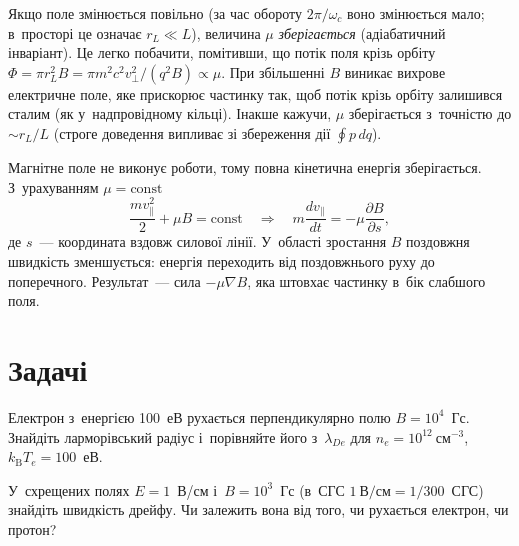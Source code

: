 Якщо поле змінюється повільно (за час обороту $2\pi/\omega_c$ воно змінюється мало;
в~просторі це означає $r_L\ll L$), величина $\mu$ \emph{зберігається} (адіабатичний
інваріант). Це легко побачити, помітивши, що потік поля крізь орбіту $\Phi=\pi r_L^2B=\pi
m^2c^2v_\perp^2/(q^2B)\propto\mu$. При збільшенні $B$ виникає вихрове електричне поле, яке
прискорює частинку так, щоб потік крізь орбіту залишився сталим (як у~надпровідному
кільці). Інакше кажучи, $\mu$ зберігається з~точністю до $\sim r_L/L$ (строге доведення
випливає зі збереження дії $\oint p\,dq$).

Магнітне поле не виконує роботи, тому повна кінетична енергія зберігається. З~урахуванням
$\mu=\mathrm{const}$
\begin{equation}\label{eq:energy-mu}
	\frac{mv_\parallel^2}2+\mu B=\mathrm{const}\quad\Rightarrow\quad m\frac{dv_\parallel}{dt}=-\mu\frac{\partial B}{\partial s},
\end{equation}
де $s$~--- координата вздовж силової лінії. У~області зростання $B$ поздовжня швидкість
зменшується: енергія переходить від поздовжнього руху до поперечного. Результат~--- сила
$-\mu\nabla B$, яка штовхає частинку в~бік слабшого поля.






\section*{Задачі}

\begin{problem}\label{prb:PlasmaLarmor}
	Електрон з~енергією 100~еВ рухається перпендикулярно полю $B=10^4$~Гс. Знайдіть
	ларморівський радіус і~порівняйте його з~$\lambda_{De}$ для
	$n_e=10^{12}~\mathrm{см}^{-3}$, $k_{\mathrm B}T_e=100$~еВ.
\end{problem}

\begin{problem}\label{prb:PlasmaExB}
	У~схрещених полях $E=1$~В/см і~$B=10^3$~Гс (в~СГС $1~\text{В/см}=1/300$~СГС) знайдіть
	швидкість дрейфу. Чи залежить вона від того, чи рухається електрон, чи протон?
\end{problem}

